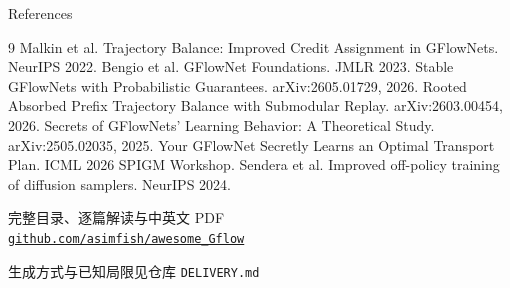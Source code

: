 \documentclass[aspectratio=169,10pt]{beamer}
\begin{document}
\begin{frame}{References}
  \small
  \begin{thebibliography}{9}
     Malkin et al. Trajectory Balance: Improved Credit Assignment in GFlowNets. NeurIPS 2022.
     Bengio et al. GFlowNet Foundations. JMLR 2023.
     Stable GFlowNets with Probabilistic Guarantees. arXiv:2605.01729, 2026.
     Rooted Absorbed Prefix Trajectory Balance with Submodular Replay. arXiv:2603.00454, 2026.
     Secrets of GFlowNets' Learning Behavior: A Theoretical Study. arXiv:2505.02035, 2025.
     Your GFlowNet Secretly Learns an Optimal Transport Plan. ICML 2026 SPIGM Workshop.
     Sendera et al. Improved off-policy training of diffusion samplers. NeurIPS 2024.
  \end{thebibliography}
\end{frame}

\begin{frame}
  \begin{center}
    \Large 完整目录、逐篇解读与中英文 PDF\\[8pt]
    \href{https://github.com/asimfish/awesome_Gflow}{\texttt{github.com/asimfish/awesome\_Gflow}}
    \vspace{14pt}

    \normalsize
    生成方式与已知局限见仓库 \texttt{DELIVERY.md}
  \end{center}
\end{frame}
\end{document}
